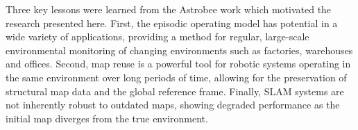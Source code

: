 Three key lessons were learned from the Astrobee work which motivated the research presented here. First, the episodic operating model has potential in a wide variety of applications, providing a method for regular, large-scale environmental monitoring of changing environments such as factories, warehouses and offices. Second, map reuse is a powerful tool for robotic systems operating in the same environment over long periods of time, allowing for the preservation of structural map data and the global reference frame. Finally, SLAM systems are not inherently robust to outdated maps, showing degraded performance as the initial map diverges from the true environment.

